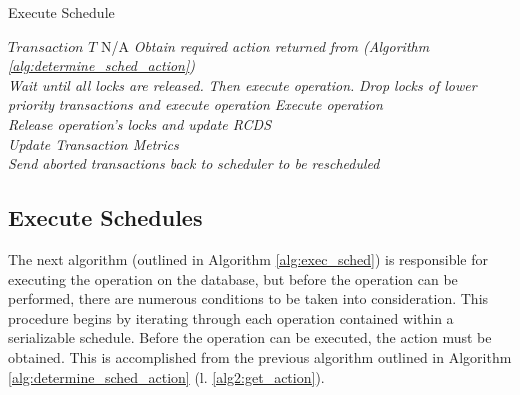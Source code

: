 \begin{algorithm}
\caption{Execute Schedule}
\label{alg:exec_sched}
\begin{algorithmic}[1]
\Require $Transaction$ $T$
\Ensure N/A
        \State \textit{Obtain required action returned}
        \State \textit{from (Algorithm \ref{alg:determine_sched_action})} \label{alg2:get_action}
        \\
         \label{alg2:decline_action}
            \State \textit{Wait until all locks are released.}
            \State \textit{Then execute operation.}
        \label{alg2:elev_action}
            \State \textit{Drop locks of lower priority }
            \State \textit{transactions and execute operation}
        \label{alg2:grant_action}
            \State \textit{Execute operation}
        \EndIf
        \\
        \State \textit{Release operation's locks and update RCDS}
    \EndFor
    \\
    \State \textit{Update Transaction Metrics}\label{alg2:update_metrics}
    \\
    \State \textit{Send aborted transactions back to}
    \State \textit{scheduler to be rescheduled}\label{alg2:abort}
\EndProcedure

\end{algorithmic}
\end{algorithm}

\subsection{Execute Schedules}
\label{pbs:exec_schedules}

The next algorithm (outlined in Algorithm \ref{alg:exec_sched}) is responsible for executing the operation on the database, but before the operation can be performed, there are numerous conditions to be taken into consideration. This procedure begins by iterating through each operation contained within a serializable schedule. Before the operation can be executed, the action must be obtained. This is accomplished from the previous algorithm outlined in Algorithm \ref{alg:determine_sched_action} (l. \ref{alg2:get_action}).

